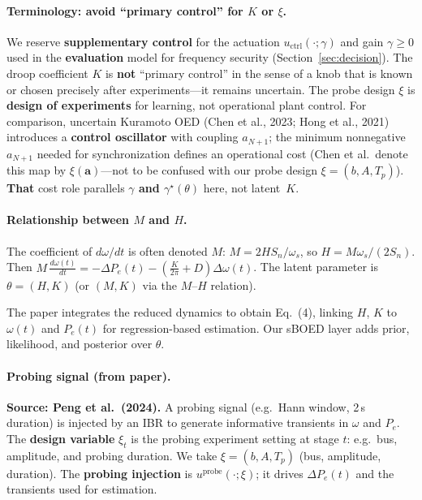 \documentclass[10pt]{article}
\begin{document}
\paragraph{Terminology: avoid ``primary control'' for $K$ or $\xi$.}
We reserve \textbf{supplementary control} for the actuation $u_{\mathrm{ctrl}}(\cdot;\gamma)$ and gain $\gamma\ge 0$ used in the \textbf{evaluation} model for frequency security (Section~\ref{sec:decision}). The droop coefficient $K$ is \textbf{not} ``primary control'' in the sense of a knob that is known or chosen precisely after experiments---it remains uncertain. The probe design $\xi$ is \textbf{design of experiments} for learning, not operational plant control. For comparison, uncertain Kuramoto OED (Chen et al., 2023; Hong et al., 2021) introduces a \textbf{control oscillator} with coupling $a_{N+1}$; the minimum nonnegative $a_{N+1}$ needed for synchronization defines an operational cost (Chen et al.\ denote this map by $\xi(\mathbf{a})$---not to be confused with our probe design $\xi=(b,A,T_p)$). \textbf{That} cost role parallels \textbf{$\gamma$ and $\gamma^\star(\theta)$} here, not latent~$K$.

\paragraph{Relationship between $M$ and $H$.}
The coefficient of $d\omega/dt$ is often denoted $M$: $M=2HS_n/\omega_s$, so $H=M\omega_s/(2S_n)$. Then $M\,\frac{d\omega(t)}{dt}=-\Delta P_e(t)-\left(\frac{K}{2\pi}+D\right)\Delta\omega(t)$. The latent parameter is $\theta=(H,K)$ (or $(M,K)$ via the $M$--$H$ relation).

The paper integrates the reduced dynamics to obtain Eq.\ (4), linking $H$, $K$ to $\omega(t)$ and $P_e(t)$ for regression-based estimation. Our sBOED layer adds prior, likelihood, and posterior over $\theta$.

\paragraph{Probing signal (from paper).}
\textbf{Source: Peng et al.\ (2024).} A probing signal (e.g.\ Hann window, 2\,s duration) is injected by an IBR to generate informative transients in $\omega$ and $P_e$. The \textbf{design variable} $\xi_t$ is the probing experiment setting at stage $t$: e.g.\ bus, amplitude, and probing duration. We take $\xi=(b,A,T_p)$ (bus, amplitude, duration). The \textbf{probing injection} is $u^{\mathrm{probe}}(\cdot;\xi)$; it drives $\Delta P_e(t)$ and the transients used for estimation.
\end{document}
